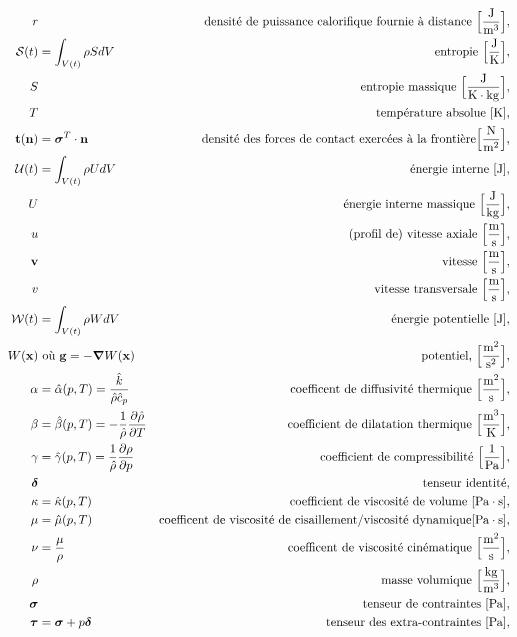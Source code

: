\begin{align*}
      r & & \textrm{densité de puissance calorifique fournie à distance } \Big[\si{\frac{J}{m^3}}\Big],\\
      \mathcal{S}(t) &= \int_{V(t)} \rho S dV & \textrm{entropie } \Big[\si{\frac{J}{K}}\Big],\\
      S & & \textrm{entropie massique } \Big[\si{\frac{J}{K \cdot kg}}\Big],\\
      T & & \textrm{température absolue } [\si{K}],\\
      \vb{t}(\vb{n}) &= \bs{\sigma}^T \cdot \vb{n} & \textrm{densité des forces de contact exercées à la frontière} \Big[\si{\frac{N}{m^2}}\Big],\\
      \mathcal{U}(t) &= \int_{V(t)} \rho U dV & \textrm{énergie interne } [\si{J}],\\
      U & & \textrm{énergie interne massique } \Big[\si{\frac{J}{kg}}\Big],\\
      u & & \textrm{(profil de) vitesse axiale } \Big[\si{\frac{m}{s}}\Big],\\
      \vb{v} & & \textrm{vitesse } \Big[\si{\frac{m}{s}}\Big],\\
      v & & \textrm{vitesse transversale } \Big[\si{\frac{m}{s}}\Big],\\
      \mathcal{W}(t) &= \int_{V(t)} \rho W dV & \textrm{énergie potentielle } [\si{J}],\\
      W(\vb{x}) & \textrm{ où } \vb{g} = -\grad W(\vb{x}) & \textrm{potentiel, }\Big[\si{\frac{m^2}{s^2}}\Big],\\
      \alpha &= \hat{\alpha}(p,T) = \frac{\hat{k}}{\hat{\rho}\hat{c}_p} & \textrm{coefficent de diffusivité thermique } \Big[\si{\frac{m^2}{s}}\Big], \\
      \beta &= \hat{\beta}(p,T) = -\recip{\hat{\rho}} \pdv{\hat{\rho}}{T} & \textrm{coefficient de dilatation thermique } \Big[\si{\frac{m^3}{K}}\Big],\\
      \gamma &= \hat{\gamma}(p,T) = \recip{\hat{\rho}} \pdv{\rho}{p} & \textrm{coefficient de compressibilité } \Big[\si{\recip{Pa}}\Big],\\
      \bs{\delta} & & \textrm{tenseur identité},\\
      \kappa &= \hat{\kappa}(p, T) & \textrm{coefficient de viscosité de volume } [\si{Pa \cdot s}],\\
      \mu &= \hat{\mu}(p,T) & \textrm{coefficent de viscosité de cisaillement/viscosité dynamique} [\si{Pa \cdot s}],\\
      \nu &= \frac{\mu}{\rho} & \textrm{coefficent de viscosité cinématique } \Big[\si{\frac{m^2}{s}} \Big], \\
      \rho & & \textrm{masse volumique } \Big[\si{\frac{kg}{m^3}}\Big],\\
      \bs{\sigma} & & \textrm{tenseur de contraintes } [\si{Pa} ],\\
      \bs{\tau} &= \bs{\sigma} + p \bs{\delta} & \textrm{tenseur des extra-contraintes } [\si{Pa}],
    \end{align*}
  \endgroup
